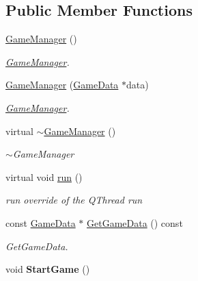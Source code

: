 \subsection*{Public Member Functions}
\begin{DoxyCompactItemize}
\item 
\hypertarget{classGameManager_aa0e2424dc1a39d380e5b6605b179bf05}{\hyperlink{classGameManager_aa0e2424dc1a39d380e5b6605b179bf05}{Game\-Manager} ()}\label{classGameManager_aa0e2424dc1a39d380e5b6605b179bf05}

\begin{DoxyCompactList}\small\item\em \hyperlink{classGameManager}{Game\-Manager}. \end{DoxyCompactList}\item 
\hyperlink{classGameManager_a80046eb2f443289f0ba1b3fa1272470a}{Game\-Manager} (\hyperlink{classGameData}{Game\-Data} $\ast$data)
\begin{DoxyCompactList}\small\item\em \hyperlink{classGameManager}{Game\-Manager}. \end{DoxyCompactList}\item 
\hypertarget{classGameManager_aaae63e38e358379c1fe507c5197a8435}{virtual \hyperlink{classGameManager_aaae63e38e358379c1fe507c5197a8435}{$\sim$\-Game\-Manager} ()}\label{classGameManager_aaae63e38e358379c1fe507c5197a8435}

\begin{DoxyCompactList}\small\item\em $\sim$\-Game\-Manager \end{DoxyCompactList}\item 
\hypertarget{classGameManager_abbde8090c24ca199815ba1e85059c96f}{virtual void \hyperlink{classGameManager_abbde8090c24ca199815ba1e85059c96f}{run} ()}\label{classGameManager_abbde8090c24ca199815ba1e85059c96f}

\begin{DoxyCompactList}\small\item\em run override of the Q\-Thread run \end{DoxyCompactList}\item 
const \hyperlink{classGameData}{Game\-Data} $\ast$ \hyperlink{classGameManager_ae6075cdc12a4b98aeddc4cda20854393}{Get\-Game\-Data} () const 
\begin{DoxyCompactList}\small\item\em Get\-Game\-Data. \end{DoxyCompactList}\item 
\hypertarget{classGameManager_a3af49a72977052275a1217c5018c737f}{void {\bfseries Start\-Game} ()}\label{classGameManager_a3af49a72977052275a1217c5018c737f}


\end{DoxyCompactItemize}
